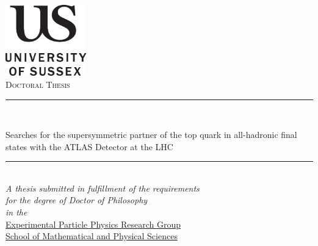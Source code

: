 \documentclass[11pt,paper=a5,footinclude=true,headinclude=true,dottedtoc, british,headsepline,headinclude]{scrbook} %
\newcommand{\myTitle}{Searches for the supersymmetric partner of the top quark in all-hadronic final states with the ATLAS Detector at the LHC}
\newcommand{\myDepartment}{\href{http://www.sussex.ac.uk/epp/}{Experimental Particle Physics Research Group\xspace}}
\newcommand{\myFaculty}{\href{http://www.sussex.ac.uk/mps/}{School of Mathematical and Physical Sciences\xspace}}
\newcommand{\myUni}{University of Sussex\xspace}
\begin{document}
\graphicspath{{./figures/}}

    
    \pagestyle{plain}
    \begin{titlepage}
        \begin{center}
            \includegraphics[width=3.5cm]{uslogo.eps} \\ \medskip
            \vspace*{.02\textheight}
            \textsc{ Doctoral Thesis}\\%

            \rule{.9\linewidth}{.6pt}\\%
            {\Large \myTitle \par}%
            \rule{.9\linewidth}{.6pt}\\[1.5cm] 

            \small \textit{A thesis submitted in fulfillment of the requirements\\ for the degree of Doctor of Philosophy}\\[0.5cm] %
            \textit{in the}\\[0.5cm]
            \myDepartment\\ \myFaculty\\[2cm]
            

\end{center}
\end{titlepage}
\end{document}
